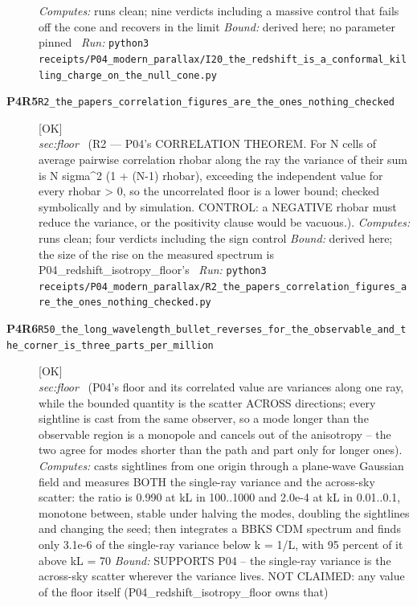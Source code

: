 \begin{description}
\emph{Computes:} runs clean; nine verdicts including a massive control that fails off the cone and recovers in the limit
 \emph{Bound:} derived here; no parameter pinned
\ \emph{Run:} \texttt{python3 receipts/P04\_modern\_parallax/I20\_the\_redshift\_is\_a\_conformal\_killing\_charge\_on\_the\_null\_cone.py}
\item[\rcptlabel{R2_the_papers_correlation_figures_are_the_ones_nothing_checked}{P4R5}\textbf{P4R5}\quad\texttt{R2\_the\_papers\_correlation\_figures\_are\_the\_ones\_nothing\_checked}]\hfill\textsf{[OK]}\\
\textit{sec:floor} \ (R2 --- P04's CORRELATION THEOREM. For N cells of average pairwise correlation rhobar along the ray the variance of their sum is N sigma\textasciicircum{}2 (1 + (N-1) rhobar), exceeding the independent value for every rhobar > 0, so the uncorrelated floor is a lower bound; checked symbolically and by simulation. CONTROL: a NEGATIVE rhobar must reduce the variance, or the positivity clause would be vacuous.). 
\emph{Computes:} runs clean; four verdicts including the sign control
 \emph{Bound:} derived here; the size of the rise on the measured spectrum is P04\_redshift\_isotropy\_floor's
\ \emph{Run:} \texttt{python3 receipts/P04\_modern\_parallax/R2\_the\_papers\_correlation\_figures\_are\_the\_ones\_nothing\_checked.py}
\item[\rcptlabel{R50_the_long_wavelength_bullet_reverses_for_the_observable_and_the_corner_is_three_parts_per_million}{P4R6}\textbf{P4R6}\quad\texttt{R50\_the\_long\_wavelength\_bullet\_reverses\_for\_the\_observable\_and\_the\_corner\_is\_three\_parts\_per\_million}]\hfill\textsf{[OK]}\\
\textit{sec:floor} \ (P04's floor and its correlated value are variances along one ray, while the bounded quantity is the scatter ACROSS directions; every sightline is cast from the same observer, so a mode longer than the observable region is a monopole and cancels out of the anisotropy -- the two agree for modes shorter than the path and part only for longer ones). 
\emph{Computes:} casts sightlines from one origin through a plane-wave Gaussian field and measures BOTH the single-ray variance and the across-sky scatter: the ratio is 0.990 at kL in 100..1000 and 2.0e-4 at kL in 0.01..0.1, monotone between, stable under halving the modes, doubling the sightlines and changing the seed; then integrates a BBKS CDM spectrum and finds only 3.1e-6 of the single-ray variance below k = 1/L, with 95 percent of it above kL = 70
 \emph{Bound:} SUPPORTS P04 -- the single-ray variance is the across-sky scatter wherever the variance lives. NOT CLAIMED: any value of the floor itself (P04\_redshift\_isotropy\_floor owns that)

\end{description}
